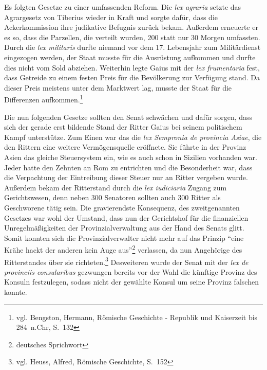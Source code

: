 \documentclass[
    12pt,
    smallheadings,
    ]{scrreprt}
\begin{document}
Es folgten Gesetze zu einer umfassenden Reform.
Die \textit{lex agraria} setzte das Agrargesetz von Tiberius wieder in Kraft und sorgte dafür, dass die Ackerkommission ihre judikative Befugnis zurück bekam.
Außerdem erneuerte er es so, dass die Parzellen, die verteilt wurden, 200 statt nur 30 Morgen umfassten.
Durch die \textit{lex militaris} durfte niemand vor dem 17. Lebensjahr zum Militärdienst eingezogen werden, der Staat musste für die Ausrüstung aufkommen und durfte dies nicht vom Sold abziehen.
Weiterhin legte Gaius mit der \textit{lex frumentaria} fest, dass Getreide zu einem festen Preis für die Bevölkerung zur Verfügung stand.
Da dieser Preis meistens unter dem Marktwert lag, musste der Staat für die Differenzen aufkommen.\footnote{vgl. Bengston, Hermann, Römische Geschichte - Republik und Kaiserzeit bis 284~n.Chr, S.~132}

Die nun folgenden Gesetze sollten den Senat schwächen und dafür sorgen, dass sich der gerade erst bildende Stand der Ritter Gaius bei seinem politischem Kampf unterstütze.
Zum Einen war das die \textit{lex Sempronia de provincia Asiae}, die den Rittern eine weitere Vermögensquelle eröffnete.
Sie führte in der Provinz Asien das gleiche Steuersystem ein, wie es auch schon in Sizilien vorhanden war.
Jeder hatte den Zehnten an Rom zu entrichten und die Besonderheit war, dass die Verpachtung der Eintreibung dieser Steuer nur an Ritter vergeben wurde.
Außerdem bekam der Ritterstand durch die \textit{lex iudiciaria} Zugang zum Gerichtswesen, denn neben 300 Senatoren sollten auch 300 Ritter als Geschworene tätig sein.
Die gravierendste Konsequenz, des zweitgenannten Gesetzes war wohl der Umstand, dass nun der Gerichtshof für die finanziellen Unregelmäßigkeiten der Provinzialverwaltung aus der Hand des Senats glitt.
Somit konnten sich die Provinzialverwalter nicht mehr auf das Prinzip "`eine Krähe hackt der anderen kein Auge aus"'\footnote{deutsches Sprichwort} verlassen, da nun Angehörige des Ritterstandes über sie richteten.\footnote{vgl. Heuss, Alfred, Römische Geschichte, S.~152}
Desweiteren wurde der Senat mit der \textit{lex de provinciis consularibus} gezwungen bereits vor der Wahl die künftige Provinz des Konsuln festzulegen, sodass nicht der gewählte Konsul um seine Provinz falschen konnte.
\end{document}
